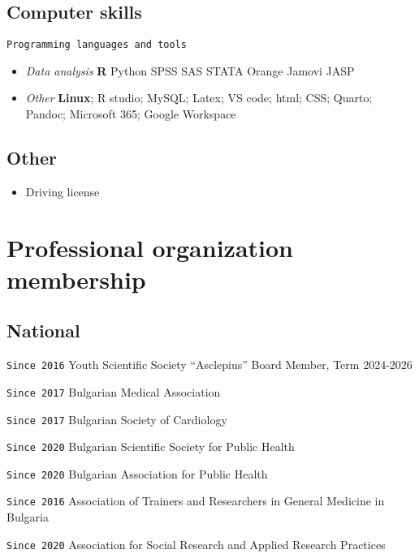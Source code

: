 \documentclass[
  12pt,
  letterpaper,
  DIV=11,
  numbers=noendperiod]{scrartcl}
\providecommand{\tightlist}{%
  \setlength{\itemsep}{0pt}\setlength{\parskip}{0pt}}\usepackage{longtable,booktabs,array}
\begin{document}
\subsection{Computer skills}\label{computer-skills}

\texttt{Programming\ languages\ and\ tools}

\begin{itemize}
\item
  \emph{Data analysis} \textbf{R} \textbar{} Python \textbar{} SPSS
  \textbar{} SAS \textbar{} STATA \textbar{} Orange \textbar{} Jamovi
  \textbar{} JASP
\item
  \emph{Other} \textbf{Linux}; R studio; MySQL; Latex; VS code; html;
  CSS; Quarto; Pandoc; Microsoft 365; Google Workspace
\end{itemize}

\subsection{Other}\label{other}

\begin{itemize}
\tightlist
\item
  Driving license
\end{itemize}

\section{Professional organization
membership}\label{professional-organization-membership}

\subsection{National}\label{national}

\texttt{Since\ 2016} Youth Scientific Society ``Asclepius'' \textbar{}
Board Member, Term 2024-2026

\texttt{Since\ 2017} Bulgarian Medical Association

\texttt{Since\ 2017} Bulgarian Society of Cardiology

\texttt{Since\ 2020} Bulgarian Scientific Society for Public Health

\texttt{Since\ 2020} Bulgarian Association for Public Health

\texttt{Since\ 2016} Association of Trainers and Researchers in General
Medicine in Bulgaria

\texttt{Since\ 2020} Association for Social Research and Applied
Research Practices
\end{document}
